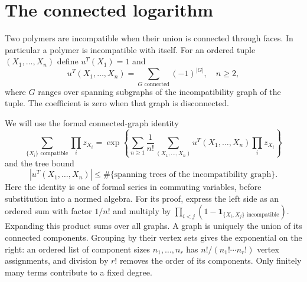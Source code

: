 \documentclass[11pt,letterpaper,reqno]{amsart}
\begin{document}
\section{The connected logarithm}
\label{subsec:rgnl-cluster-logarithm}

Two polymers are incompatible when their union is connected
through faces. In particular a polymer is incompatible with
itself. For an ordered tuple $(X_1,\ldots,X_n)$ define
$u^T(X_1)=1$ and
\[
 u^T(X_1,\ldots,X_n)=\sum_{G\text{ connected}}
                                      (-1)^{|G|},\quad n\ge2,
\]
where $G$ ranges over spanning subgraphs of the incompatibility
graph of the tuple. The coefficient is zero when that graph
is disconnected.

We will use the formal connected-graph identity
\begin{equation}\label{eq:rgnl-connected-graph-identity}
 \sum_{\{X_i\}\text{ compatible}}\prod_i z_{X_i}
 =\exp\left\{\sum_{n\ge1}\frac1{n!}
       \sum_{(X_1,\ldots,X_n)}u^T(X_1,\ldots,X_n)
                                           \prod_i z_{X_i}\right\}
\end{equation}
and the tree bound
\begin{equation}\label{eq:rgnl-tree-domination}
 |u^T(X_1,\ldots,X_n)|
       \le\#\{\text{spanning trees of the incompatibility graph}\}.
\end{equation}
Here the identity is one of formal series in commuting
variables, before substitution into a normed algebra.
For its proof, express the left side as an ordered sum with
factor $1/n!$ and multiply by
$\prod_{i<j}(1-\mathbf1_{\{X_i,X_j\}\text{ incompatible}})$.
Expanding this product sums over all graphs. A graph is
uniquely the union of its connected components. Grouping by
their vertex sets gives the exponential on the right:
an ordered list of component sizes $n_1,\ldots,n_r$ has
$n!/(n_1!\cdots n_r!)$ vertex assignments, and division
by $r!$ removes the order of its components.
Only finitely many terms contribute to a fixed degree.
\end{document}
